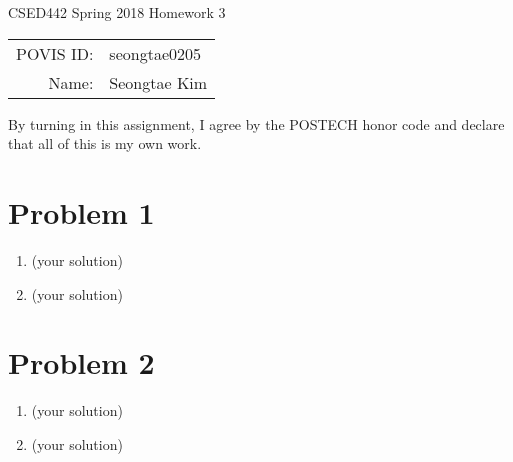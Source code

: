 \documentclass[12pt]{article}
\begin{document}
\begin{center}
{\Large CSED442 Spring 2018 Homework 3}

\begin{tabular}{rl}
POVIS ID: & seongtae0205\\
Name: & Seongtae Kim\\
\end{tabular}
\end{center}

By turning in this assignment, I agree by the POSTECH honor code and declare that all of this is my own work.

\section*{Problem 1}

\begin{enumerate}[label=(\alph*)]
  \item (your solution)
  \item (your solution)
\end{enumerate}

\section*{Problem 2}

\begin{enumerate}[label=(\alph*)]
  \item (your solution)
  \item (your solution)
\end{enumerate}
\end{document}
